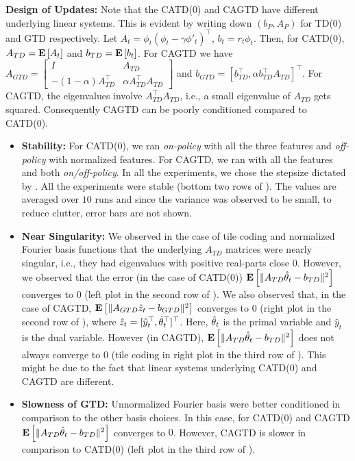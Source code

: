 \textbf{Design of Updates:} Note that the CATD(0) and CAGTD have different underlying linear systems. This is evident by writing down $(b_P,A_P)$ for TD(0) and GTD respectively. Let $A_t=\phi_t(\phi_t-\gamma\phi'_t)^\top$, $b_t=r_t \phi_t$.
Then, for CATD(0), $A_{TD}=\mathbf{E}\left[A_t\right]$ and $b_{TD}=\mathbf{E}\left[b_t\right]$.  For CAGTD we have $A_{GTD}=\left[\begin{matrix}I & A_{TD} \\ -(1-\alpha )A_{TD}^\top &\alpha A_{TD}^\top A_{TD}\end{matrix}\right]$ and $b_{GTD}=[b_{TD}^\top,\alpha b_{TD}^\top A_{TD}]^\top$. For CAGTD, the eigenvalues involve $A_{TD}^\top A_{TD}$, i.e., a small eigenvalue of $A_{TD}$ gets squared.
Consequently CAGTD can be poorly conditioned compared to CATD(0).

\begin{itemize}[leftmargin=*]
\item \textbf{Stability:} For CATD(0), we ran  \emph{on-policy} with all the three features and \emph{off-policy} with normalized features. For CAGTD, we ran with all the features and both \emph{on/off-policy}. In all the experiments, we chose the stepsize dictated by . All the experiments were stable (bottom two rows of ). The values are averaged over $10$ runs  and since the variance was observed to be small, 
to reduce clutter, error bars are not shown.
\item \textbf{Near Singularity: } We observed in the case of tile coding and normalized Fourier basis functions that the underlying $A_{TD}$ matrices were nearly singular, i.e., they had eigenvalues with positive real-parts close $0$. However, we observed that the error (in the case of CATD(0)) $\mathbf{E}\left[\| A_{TD}\hat{\theta}_t -b_{TD}\|^2\right]$ converges to $0$ (left plot in the second row of ). We also observed that, in the case of CAGTD, 
$\mathbf{E}\left[\| A_{GTD}\hat{z}_t-b_{GTD}\|^2\right]$ converges to $0$ (right plot in the second row of ), where $\hat{z}_t=[\hat{y}_t^\top,\hat{\theta}_t^\top]^\top$. Here, $\hat{\theta}_t$ is the primal variable and $\hat{y}_t$ is the dual variable. However (in CAGTD), $\mathbf{E}\left[\| A_{TD}\hat{\theta}_t-b_{TD}\|^2\right]$ does not always converge to $0$ (tile coding in right plot in the third row of ). This might be due to the fact that linear systems underlying CATD(0) and CAGTD are different. 
\item \textbf{Slowness of GTD:} Unnormalized Fourier basis were better conditioned in comparison to the other basis choices. In this case, for CATD(0) and CAGTD $\mathbf{E}\left[\| A_{TD}\hat{\theta}_t -b_{TD}\|^2\right]$ converges to $0$. However,  CAGTD is slower in comparison to CATD(0) (left plot in the third row of ). 
\end{itemize}

